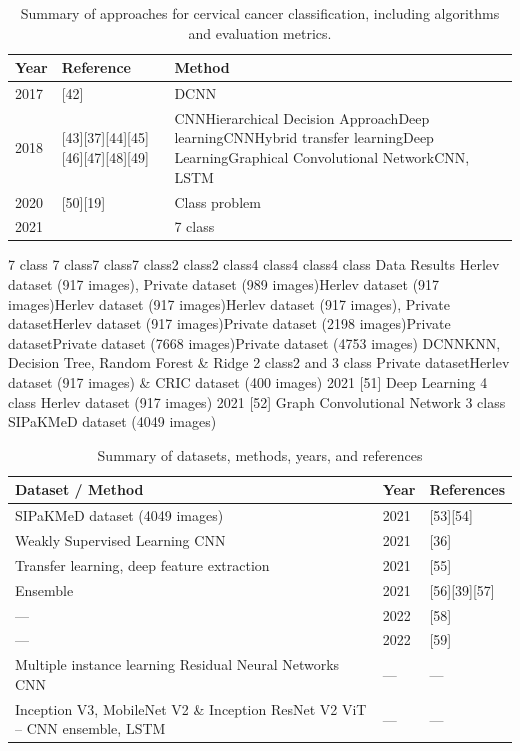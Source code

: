 \documentclass{svjour3}
\begin{document}
\begin{table}[htbp]
\centering
\caption{Summary of approaches for cervical cancer classification, including algorithms and evaluation metrics.}
\label{tab:summary}
\begin{tabular}{lll}
\hline
Year & Reference & Method \\
\hline
2017 & [42] & DCNN \\
2018 & [43][37][44][45][46][47][48][49] & CNNHierarchical Decision ApproachDeep learningCNNHybrid transfer learningDeep LearningGraphical Convolutional NetworkCNN, LSTM \\
2020 & [50][19] & Class problem \\
2021 & & 7 class \\
\hline
\end{tabular}
\end{table}

7 class
7 class7 class7 class2 class2 class4 class4 class4 class
Data
Results
Herlev dataset (917 images), Private dataset (989 images)Herlev dataset (917 images)Herlev dataset (917 images)Herlev dataset (917 images), Private datasetHerlev dataset (917 images)Private dataset (2198 images)Private datasetPrivate dataset (7668 images)Private dataset (4753 images)
DCNNKNN, Decision Tree, Random Forest \& Ridge
2 class2 and 3 class
Private datasetHerlev dataset (917 images) \& CRIC dataset (400 images)
2021
[51]
Deep Learning
4 class
Herlev dataset (917 images)
2021
[52]
Graph Convolutional Network
3 class
SIPaKMeD dataset (4049 images)

\begin{table}[htbp]
\centering
\caption{Summary of datasets, methods, years, and references}
\label{tab:summary}
\begin{tabular}{lll}
\hline
Dataset / Method & Year & References \\
\hline
SIPaKMeD dataset (4049 images) & 2021 & [53][54] \\
Weakly Supervised Learning CNN & 2021 & [36] \\
Transfer learning, deep feature extraction & 2021 & [55] \\
Ensemble & 2021 & [56][39][57] \\
— & 2022 & [58] \\
— & 2022 & [59] \\
Multiple instance learning Residual Neural Networks CNN & — & — \\
Inception V3, MobileNet V2 \& Inception ResNet V2 ViT – CNN ensemble, LSTM & — & — \\
\hline
\end{tabular}
\end{table}
\end{document}
